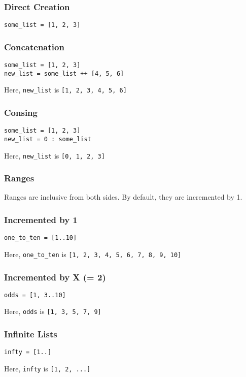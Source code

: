 \documentclass{article}
\begin{document}
\subsubsection*{Direct Creation}
\begin{verbatim}
some_list = [1, 2, 3]
\end{verbatim}

\subsubsection*{Concatenation}
\begin{verbatim}
some_list = [1, 2, 3]
new_list = some_list ++ [4, 5, 6]
\end{verbatim}
Here, \texttt{new\_list} is \texttt{[1, 2, 3, 4, 5, 6]}

\subsubsection*{Consing}
\begin{verbatim}
some_list = [1, 2, 3]
new_list = 0 : some_list
\end{verbatim}
Here, \texttt{new\_list} is \texttt{[0, 1, 2, 3]}





\subsubsection{Ranges} Ranges are inclusive from both sides. By
default, they are incremented by 1.

\subsubsection*{Incremented by 1}
\begin{verbatim}
one_to_ten = [1..10]
\end{verbatim}
Here, \texttt{one\_to\_ten} is \texttt{[1, 2, 3, 4, 5, 6, 7, 8, 9,
  10]}

\subsubsection*{Incremented by X (= 2)}
\begin{verbatim}
odds = [1, 3..10]
\end{verbatim}
Here, \texttt{odds} is \texttt{[1, 3, 5, 7, 9]}

\subsubsection*{Infinite Lists}
\begin{verbatim}
infty = [1..]
\end{verbatim}
Here, \texttt{infty} is \texttt{[1, 2, ...]}
\end{document}
